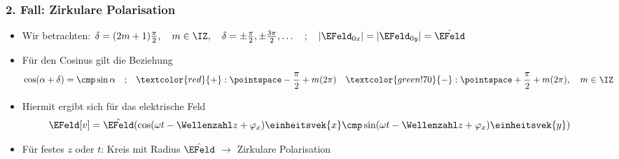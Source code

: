 \begin{frame}
  \frametitle{2. Fall: Zirkulare Polarisation}
  \begin{itemize}[<+->]
  \item Wir betrachten: \(\delta = (2m+1) \frac{\pi}{2}, \quad m \in \IZ , \quad\delta = \pm \frac{\pi}{2}, \pm \frac{3\pi}{2},\ldots \quad ;\quad\vert \EFeld_{0x} \vert = \vert \EFeld_{0y} \vert = \hat{\EFeld} \)
  \item Für den Cosinus gilt die Beziehung
    \begin{align*}
\begin{split}
 \cos ( \alpha + \delta ) = \cmp \sin \alpha \quad;\quad &\textcolor{red}{+} : \pointspace -\frac{\pi}{2} + m (2\pi) \quad\textcolor{green!70}{-} : \pointspace  +\frac{\pi}{2} + m (2 \pi), \quad m \in \IZ
\end{split}
\end{align*}
\item Hiermit ergibt sich für das elektrische Feld
\begin{align*}
  \EFeld[v] &= \hat{\EFeld}(\cos(\omega t - \Wellenzahl z + \varphi_x)\einheitsvek{x} \cmp \sin (\omega t - \Wellenzahl z + \varphi_x)\einheitsvek{y})
\end{align*}
\item Für festes \(z\) oder \(t\): Kreis mit Radius \(\hat{\EFeld}\)
  \(\to\) \alert{Zirkulare Polarisation}
  \medskip
  

\end{itemize}
\end{frame}
